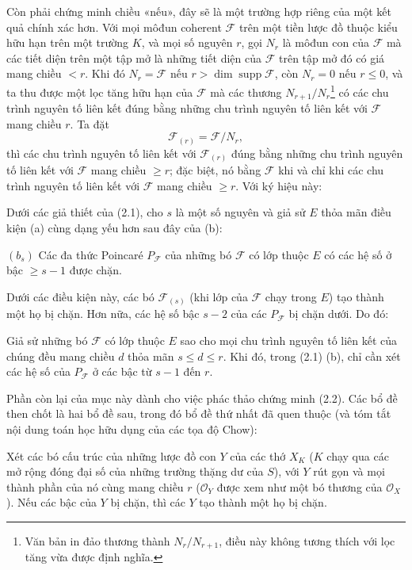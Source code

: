 Còn phải chứng minh chiều «nếu», đây sẽ là một trường hợp riêng của một kết quả
chính xác hơn. Với mọi môđun coherent $\mathcal F$ trên một tiền lược đồ thuộc
kiểu hữu hạn trên một trường $K$, và mọi số nguyên $r$, gọi $N_r$ là môđun con
của $\mathcal F$ mà các tiết diện trên một tập mở là những tiết diện của
$\mathcal F$ trên tập mở đó có giá mang chiều $<r$. Khi đó
$N_r=\mathcal F$ nếu $r>\dim\operatorname{supp}\mathcal F$, còn $N_r=0$ nếu
$r\leq0$, và ta thu được một lọc tăng hữu hạn của $\mathcal F$ mà các thương
$N_{r+1}/N_r$\footnote{Văn bản in đảo thương thành $N_r/N_{r+1}$, điều này
không tương thích với lọc tăng vừa được định nghĩa.} có các chu trình nguyên tố
liên kết đúng bằng những chu trình nguyên tố liên kết với $\mathcal F$ mang
chiều $r$. Ta đặt
\[
\mathcal F_{(r)}=\mathcal F/N_r,
\]
thì các chu trình nguyên tố liên kết với $\mathcal F_{(r)}$ đúng bằng những chu
trình nguyên tố liên kết với $\mathcal F$ mang chiều $\geq r$; đặc biệt, nó
bằng $\mathcal F$ khi và chỉ khi các chu trình nguyên tố liên kết với
$\mathcal F$ mang chiều $\geq r$. Với ký hiệu này:

 Dưới các giả thiết của (2.1), cho $s$ là một số nguyên
và giả sử $E$ thỏa mãn điều kiện (a) cùng dạng yếu hơn sau đây của (b):

\medskip
\noindent $(b_s)$ Các đa thức Poincaré $P_{\mathcal F}$ của những bó
$\mathcal F$ có lớp thuộc $E$ có các hệ số ở bậc $\geq s-1$ được chặn.

Dưới các điều kiện này, các bó $\mathcal F_{(s)}$ (khi lớp của $\mathcal F$
chạy trong $E$) tạo thành một họ bị chặn. Hơn nữa, các hệ số bậc $s-2$ của
các $P_{\mathcal F}$ bị chặn dưới.
Do đó:

 Giả sử những bó $\mathcal F$ có lớp thuộc $E$ sao cho
mọi chu trình nguyên tố liên kết của chúng đều mang chiều $d$ thỏa mãn
$s\leq d\leq r$. Khi đó, trong (2.1) (b), chỉ cần xét các hệ số của
$P_{\mathcal F}$ ở các bậc từ $s-1$ đến $r$.

Phần còn lại của mục này dành cho việc phác thảo chứng minh (2.2). Các bổ đề
then chốt là hai bổ đề sau, trong đó bổ đề thứ nhất đã quen thuộc (và tóm tắt
nội dung toán học hữu dụng của các tọa độ Chow):

 Xét các bó cấu trúc của những lược đồ con $Y$ của
các thớ $X_K$ ($K$ chạy qua các mở rộng đóng đại số của những trường thặng dư
của $S$), với $Y$ rút gọn và mọi thành phần của nó cùng mang chiều $r$
($\mathcal O_Y$ được xem như một bó thương của $\mathcal O_X$). Nếu các bậc
của $Y$ bị chặn, thì các $Y$ tạo thành một họ bị chặn.

